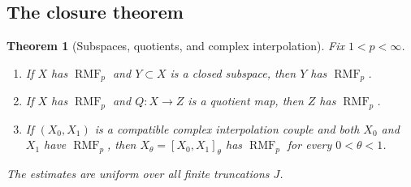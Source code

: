 \documentclass[11pt]{article}
\newtheorem{theorem}{Theorem}[section]
\theoremstyle{definition}
\newcommand{\RMF}{\operatorname{RMF}}
\newcommand{\1}{\mathbf 1}
\begin{document}
\subsection{The closure theorem}

\begin{theorem}[Subspaces, quotients, and complex interpolation]
\label{thm:closure}
Fix $1<p<\infty$.
\begin{enumerate}[label=\textup{(\roman*)}]
\item If $X$ has $\RMF_p$ and $Y\subset X$ is a closed subspace, then $Y$ has
$\RMF_p$.
\item If $X$ has $\RMF_p$ and $Q:X\to Z$ is a quotient map, then $Z$ has
$\RMF_p$.
\item If $(X_0,X_1)$ is a compatible complex interpolation couple and both
$X_0$ and $X_1$ have $\RMF_p$, then
$X_\theta=[X_0,X_1]_\theta$ has $\RMF_p$ for every $0<\theta<1$.
\end{enumerate}
The estimates are uniform over all finite truncations $J$.
\end{theorem}
\end{document}
